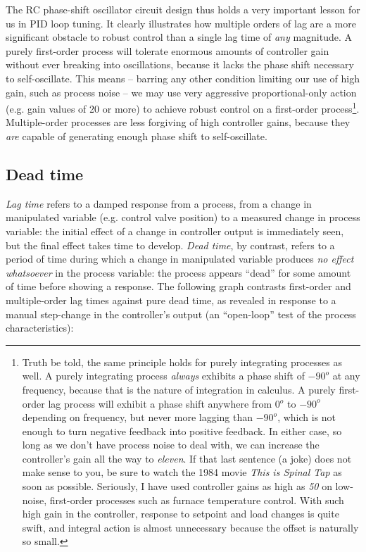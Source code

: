 The RC phase-shift oscillator circuit design thus holds a very important lesson for us in PID loop tuning.  It clearly illustrates how multiple orders of lag are a more significant obstacle to robust control than a single lag time of \textit{any} magnitude.  A purely first-order process will tolerate enormous amounts of controller gain without ever breaking into oscillations, because it lacks the phase shift necessary to self-oscillate.  This means -- barring any other condition limiting our use of high gain, such as process noise -- we may use very aggressive proportional-only action (e.g. gain values of 20 or more) to achieve robust control on a first-order process\footnote{Truth be told, the same principle holds for purely integrating processes as well.  A purely integrating process \textit{always} exhibits a phase shift of $-90^{o}$ at any frequency, because that is the nature of integration in calculus.  A purely first-order lag process will exhibit a phase shift anywhere from 0$^{o}$ to $-90^{o}$ depending on frequency, but never more lagging than $-90^{o}$, which is not enough to turn negative feedback into positive feedback.  In either case, so long as we don't have process noise to deal with, we can increase the controller's gain all the way to \textit{eleven}.  If that last sentence (a joke) does not make sense to you, be sure to watch the 1984 movie \textit{This is Spinal Tap} as soon as possible.  Seriously, I have used controller gains as high as \textit{50} on low-noise, first-order processes such as furnace temperature control.  With such high gain in the controller, response to setpoint and load changes is quite swift, and integral action is almost unnecessary because the offset is naturally so small.}.  Multiple-order processes are less forgiving of high controller gains, because they \textit{are} capable of generating enough phase shift to self-oscillate.    










\filbreak
\subsection{Dead time}

\textit{Lag time} refers to a damped response from a process, from a change in manipulated variable (e.g. control valve position) to a measured change in process variable: the initial effect of a change in controller output is immediately seen, but the final effect takes time to develop.  \textit{Dead time}, by contrast, refers to a period of time during which a change in manipulated variable produces \textit{no effect whatsoever} in the process variable: the process appears ``dead'' for some amount of time before showing a response.  The following graph contrasts first-order and multiple-order lag times against pure dead time, as revealed in response to a manual step-change in the controller's output (an ``open-loop'' test of the process characteristics):     

